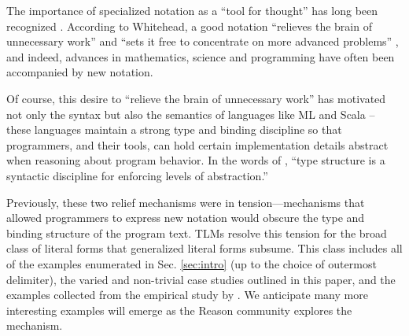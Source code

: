 \documentclass[acmsmall,screen]{acmart}
\begin{document}
The importance of specialized notation as a ``tool for thought'' has long been recognized \cite{DBLP:journals/cacm/Iverson80}. According to Whitehead, a good notation ``relieves the brain of unnecessary work'' and ``sets it free to concentrate on more advanced problems'' \cite{cajori1928history}, and indeed, advances in mathematics, science and programming have often been accompanied by new notation. 

Of course, this desire to ``relieve the brain of unnecessary work'' has motivated not only the syntax but also the semantics of languages like ML and Scala -- these languages maintain a strong type and binding discipline so that programmers, and their tools, can hold certain implementation details abstract when reasoning about program behavior.  In the words of \citet{B304}, ``type structure is a syntactic discipline for enforcing levels of abstraction.''

Previously, these two relief mechanisms were in tension---mechanisms  that allowed programmers to express new notation would obscure the type and binding structure of the program text. TLMs resolve this tension for the broad class of literal forms that generalized literal forms subsume. This class includes all of the examples enumerated in Sec. \ref{sec:intro} (up to the choice of outermost delimiter), the varied and non-trivial case studies outlined in this paper, and the examples collected from the empirical study by \citet{TSLs}. We anticipate many more interesting examples will emerge as the Reason community explores the mechanism.
\end{document}
